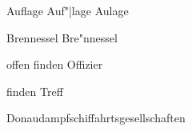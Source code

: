 \documentclass{article}
\begin{document}




Auflage Auf"|lage  Aulage

Brennessel Bre"nnessel

offen finden Offizier

finden Treff


Donaudampfschiffahrtsgesellschaften

\end{document}
